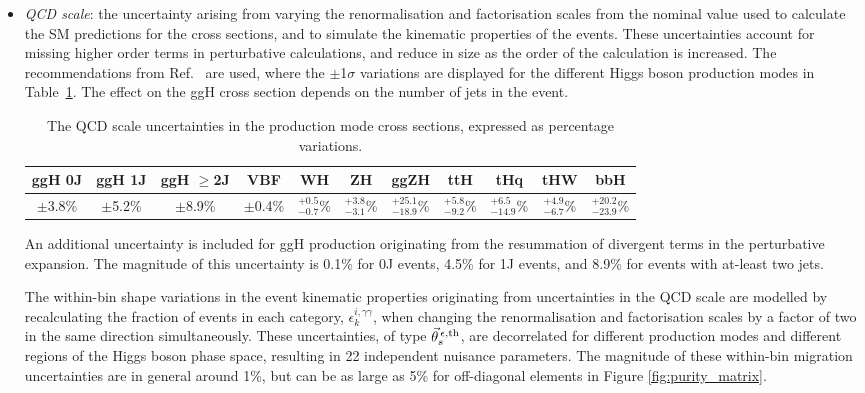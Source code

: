 \begin{itemize}
    \item \textit{QCD scale}: the uncertainty arising from varying the renormalisation and factorisation scales from the nominal value used to calculate the SM predictions for the cross sections, and to simulate the kinematic properties of the events. These uncertainties account for missing higher order terms in perturbative calculations, and reduce in size as the order of the calculation is increased. The recommendations from Ref.~\cite{deFlorian:2016spz} are used, where the $\pm$1$\sigma$ variations are displayed for the different Higgs boson production modes in Table~\ref{tab:qcdscale_variation}. The effect on the ggH cross section depends on the number of jets in the event.
    
    \begin{table}[htb]
        \caption[QCD scale uncertainties in production mode cross sections]{The QCD scale uncertainties in the production mode cross sections, expressed as percentage variations.}
        \label{tab:qcdscale_variation}
        \centering
        \footnotesize
        \setlength{\tabcolsep}{3pt}
        \renewcommand{\arraystretch}{2}
        \begin{tabular}{c|c|c|c|c|c|c|c|c|c|c}
            ggH 0J & ggH 1J & ggH $\geq$2J & VBF & WH & ZH & ggZH & ttH & tHq & tHW & bbH   \\ \hline
            $\pm$3.8\%  & $\pm$5.2\%  & $\pm$8.9\% & $\pm$0.4\% & $^{+0.5}_{-0.7}$\% & $^{+3.8}_{-3.1}$\%  & $^{+25.1}_{-18.9}$\% & $^{+5.8}_{-9.2}$\% & $^{+6.5}_{-14.9}$\% & $^{+4.9}_{-6.7}$\% & $^{+20.2}_{-23.9}$\% \\ 
        \end{tabular}
    \end{table}

    \noindent
    An additional uncertainty is included for ggH production originating from the resummation of divergent terms in the perturbative expansion. The magnitude of this uncertainty is 0.1\% for 0J events, 4.5\% for 1J events, and 8.9\% for events with at-least two jets.
    
    The within-bin shape variations in the event kinematic properties originating from uncertainties in the QCD scale are modelled by recalculating the fraction of events in each category, $\epsilon^{i,\gamma\gamma}_{k}$, when changing the renormalisation and factorisation scales by a factor of two in the same direction simultaneously. These uncertainties, of type $\vec{\theta}^{\,\epsilon,{\rm{th}}}_{s}$, are decorrelated for different production modes and different regions of the Higgs boson phase space, resulting in 22 independent nuisance parameters. The magnitude of these within-bin migration uncertainties are in general around 1\%, but can be as large as 5\% for off-diagonal elements in Figure \ref{fig:purity_matrix}.
    

\end{itemize}
